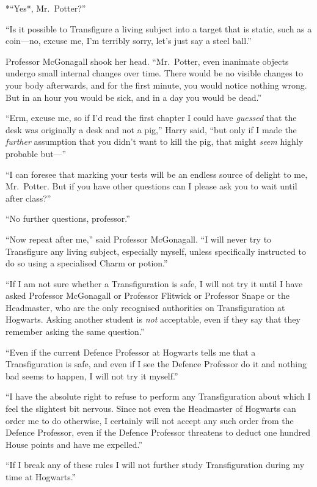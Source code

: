 *``Yes*, Mr.~Potter?''

``Is it possible to Transfigure a living subject into a target that is
static, such as a coin---no, excuse me, I'm terribly sorry, let's just
say a steel ball.''

Professor McGonagall shook her head. ``Mr.~Potter, even inanimate
objects undergo small internal changes over time. There would be no
visible changes to your body afterwards, and for the first minute, you
would notice nothing wrong. But in an hour you would be sick, and in a
day you would be dead.''

``Erm, excuse me, so if I'd read the first chapter I could have
\emph{guessed} that the desk was originally a desk and not a pig,''
Harry said, ``but only if I made the \emph{further} assumption that you
didn't want to kill the pig, that might \emph{seem} highly probable
but---''

``I can foresee that marking your tests will be an endless source of
delight to me, Mr.~Potter. But if you have other questions can I please
ask you to wait until after class?''

``No further questions, professor.''

``Now repeat after me,'' said Professor McGonagall. ``I will never try
to Transfigure any living subject, especially myself, unless
specifically instructed to do so using a specialised Charm or potion.''

``If I am not sure whether a Transfiguration is safe, I will not try it
until I have asked Professor McGonagall or Professor Flitwick or
Professor Snape or the Headmaster, who are the only recognised
authorities on Transfiguration at Hogwarts. Asking another student is
\emph{not} acceptable, even if they say that they remember asking the
same question.''

``Even if the current Defence Professor at Hogwarts tells me that a
Transfiguration is safe, and even if I see the Defence Professor do it
and nothing bad seems to happen, I will not try it myself.''

``I have the absolute right to refuse to perform any Transfiguration
about which I feel the slightest bit nervous. Since not even the
Headmaster of Hogwarts can order me to do otherwise, I certainly will
not accept any such order from the Defence Professor, even if the
Defence Professor threatens to deduct one hundred House points and have
me expelled.''

``If I break any of these rules I will not further study Transfiguration
during my time at Hogwarts.''

